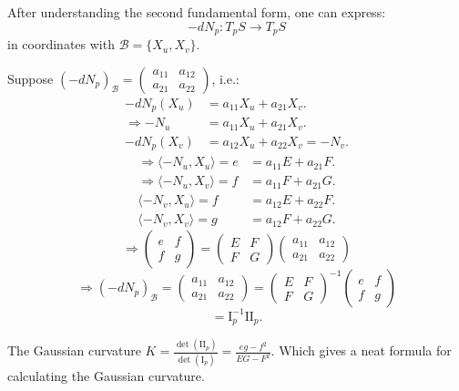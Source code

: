 \documentclass{article}
\begin{document}
\begin{remark}
After understanding the second fundamental form, one can express:
$$ -dN_p: T_p S \to T_p S $$
in coordinates with $\mathcal{B} = \{ X_u, X_v \}$.

Suppose $(-dN_p)_{\mathcal{B}} = \begin{pmatrix} a_{11} & a_{12} \\ a_{21} & a_{22} \end{pmatrix}$, i.e.:
\begin{align*}
-dN_p (X_u) &= a_{11} X_u + a_{21} X_v. \\
\Rightarrow -N_u &= a_{11} X_u + a_{21} X_v. \\
-dN_p (X_v) &= a_{12} X_u + a_{22} X_v = -N_v.
\end{align*}
\begin{align*}
\Rightarrow \langle -N_u, X_u \rangle = e &= a_{11} E + a_{21} F. \\
\Rightarrow \langle -N_u, X_v \rangle = f &= a_{11} F + a_{21} G. \\
\langle -N_v, X_u \rangle = f &= a_{12} E + a_{22} F. \\
\langle -N_v, X_v \rangle = g &= a_{12} F + a_{22} G.
\end{align*}
$$ \Rightarrow \begin{pmatrix} e & f \\ f & g \end{pmatrix} = \begin{pmatrix} E & F \\ F & G \end{pmatrix} \begin{pmatrix} a_{11} & a_{12} \\ a_{21} & a_{22} \end{pmatrix} $$
$$ \Rightarrow (-dN_p)_{\mathcal{B}} = \begin{pmatrix} a_{11} & a_{12} \\ a_{21} & a_{22} \end{pmatrix} = \begin{pmatrix} E & F \\ F & G \end{pmatrix}^{-1} \begin{pmatrix} e & f \\ f & g \end{pmatrix} $$
$$ = \mathrm{I}_p^{-1} \mathrm{II}_p. $$
\end{remark}

\begin{corollary}
The Gaussian curvature $K = \frac{\det (\mathrm{II}_p)}{\det (\mathrm{I}_p)} = \frac{eg - f^2}{EG - F^2}$.
Which gives a neat formula for calculating the Gaussian curvature.
\end{corollary}
\end{document}
